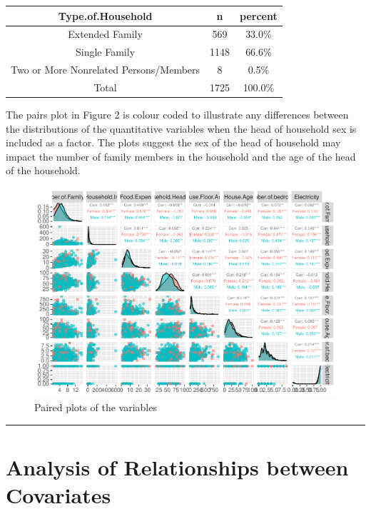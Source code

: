 \documentclass[
]{article}
\begin{document}
\begin{tabular}{ccc}
\toprule
Type.of.Household & n & percent\\
\midrule
Extended Family & 569 & 33.0\%\\
Single Family & 1148 & 66.6\%\\
Two or More Nonrelated Persons/Members & 8 & 0.5\%\\
Total & 1725 & 100.0\%\\
\bottomrule
\end{tabular}

The pairs plot in Figure 2 is colour coded to illustrate any differences
between the distributions of the quantitative variables when the head of
household sex is included as a factor. The plots suggest the sex of the
head of household may impact the number of family members in the
household and the age of the head of the household.

\begin{figure}

{\centering \includegraphics[width=1\linewidth]{Group_01_Project2_demo_files/figure-latex/pairs-1} 

}

\caption{Paired plots of the variables}\label{fig:pairs}
\end{figure}

\begin{center}\rule{0.5\linewidth}{0.5pt}\end{center}

\newpage

\hypertarget{sec:ARC}{%
\section{Analysis of Relationships between Covariates}\label{sec:ARC}}
\end{document}

